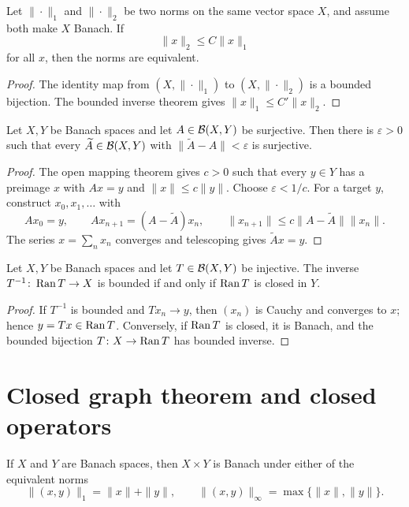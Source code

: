 \begin{notetheorem}
Let $\|\cdot\|_1$ and $\|\cdot\|_2$ be two norms on the same vector space
$X$, and assume both make $X$ Banach.  If
\[
  \|x\|_2\le C\|x\|_1
\]
for all $x$, then the norms are equivalent.
\end{notetheorem}

\begin{proof}
The identity map from $(X,\|\cdot\|_1)$ to $(X,\|\cdot\|_2)$ is a bounded
bijection.  The bounded inverse theorem gives
$\|x\|_1\le C'\|x\|_2$.
\end{proof}

\begin{notetheorem}
Let $X,Y$ be Banach spaces and let $A\in\mathcal{B}(X,Y)$ be surjective.  Then
there is $\varepsilon>0$ such that every
$\widetilde A\in\mathcal{B}(X,Y)$ with
$\|\widetilde A-A\|<\varepsilon$ is surjective.
\end{notetheorem}

\begin{proof}
The open mapping theorem gives $c>0$ such that every $y\in Y$ has a preimage
$x$ with $Ax=y$ and $\|x\|\le c\|y\|$.  Choose
$\varepsilon<1/c$.  For a target $y$, construct $x_0,x_1,\ldots$ with
\[
  Ax_0=y,
  \qquad
  Ax_{n+1}=(A-\widetilde A)x_n,
  \qquad
  \|x_{n+1}\|\le c\|A-\widetilde A\|\|x_n\|.
\]
The series $x=\sum_nx_n$ converges and telescoping gives
$\widetilde Ax=y$.
\end{proof}

\begin{notetheorem}
Let $X,Y$ be Banach spaces and let $T\in\mathcal{B}(X,Y)$ be injective.  The
inverse $T^{-1}\colon\operatorname{Ran} T\to X$ is bounded if and only if $\operatorname{Ran} T$ is
closed in $Y$.
\end{notetheorem}

\begin{proof}
If $T^{-1}$ is bounded and $Tx_n\to y$, then $(x_n)$ is Cauchy and converges
to $x$; hence $y=Tx\in\operatorname{Ran} T$.  Conversely, if $\operatorname{Ran} T$ is closed, it is
Banach, and the bounded bijection $T\colon X\to\operatorname{Ran} T$ has bounded inverse.
\end{proof}

\section{Closed graph theorem and closed operators}

\begin{notetheorem}
If $X$ and $Y$ are Banach spaces, then $X\times Y$ is Banach under either of
the equivalent norms
\[
  \|(x,y)\|_1=\|x\|+\|y\|,
  \qquad
  \|(x,y)\|_\infty=\max\{\|x\|,\|y\|\}.
\]
\end{notetheorem}

